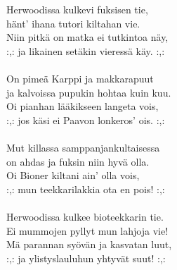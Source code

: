
            Herwoodissa kulkevi fuksisen tie, \\
            hänt’ ihana tutori kiltahan vie. \\
            Niin pitkä on matka ei tutkintoa näy, \\
            :,: ja likainen setäkin vieressä käy. :,: \\
\hspace{10mm} \\
            On pimeä Karppi ja makkarapuut \\
            ja kalvoissa pupukin hohtaa kuin kuu. \\
            Oi pianhan lääkikseen langeta vois, \\
            :,: jos käsi ei Paavon lonkeros’ ois. :,: \\
\hspace{10mm} \\
            Mut killassa samppanjankultaisessa \\
            on ahdas ja fuksin niin hyvä olla. \\
            Oi Bioner kiltani ain’ olla vois, \\
            :,: mun teekkarilakkia ota en pois! :,: \\
\hspace{10mm} \\
            Herwoodissa kulkee bioteekkarin tie. \\
            Ei mummojen pyllyt mun lahjoja vie! \\
            Mä parannan syövän ja kasvatan luut, \\
            :,: ja ylistyslauluhun yhtyvät suut! :,: \\
